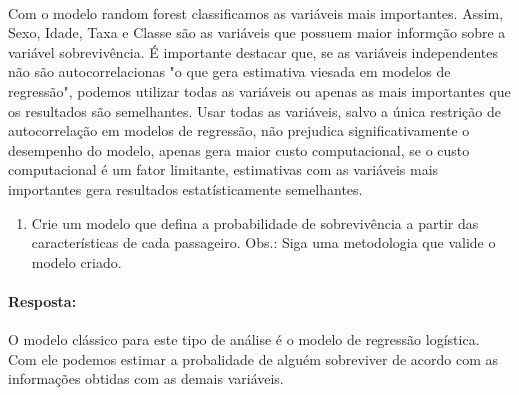 \documentclass[11pt]{article}
\providecommand{\tightlist}{%
      \setlength{\itemsep}{0pt}\setlength{\parskip}{0pt}}
\begin{document}
    \begin{center}
    \end{center}
    { \hspace*{\fill} \\}
    
    Com o modelo random forest classificamos as variáveis mais importantes.
Assim, Sexo, Idade, Taxa e Classe são as variáveis que possuem maior
informção sobre a variável sobrevivência. É importante destacar que, se
as variáveis independentes não são autocorrelacionas "o que gera
estimativa viesada em modelos de regressão", podemos utilizar todas as
variáveis ou apenas as mais importantes que os resultados são
semelhantes. Usar todas as variáveis, salvo a única restrição de
autocorrelação em modelos de regressão, não prejudica significativamente
o desempenho do modelo, apenas gera maior custo computacional, se o
custo computacional é um fator limitante, estimativas com as variáveis
mais importantes gera resultados estatísticamente semelhantes.

    \begin{enumerate}
\def\labelenumi{\arabic{enumi})}
\setcounter{enumi}{2}
\tightlist
\item
  Crie um modelo que defina a probabilidade de sobrevivência a partir
  das características de cada passageiro. Obs.: Siga uma metodologia que
  valide o modelo criado.
\end{enumerate}

\paragraph{Resposta:}\label{resposta}

O modelo clássico para este tipo de análise é o modelo de regressão
logística. Com ele podemos estimar a probalidade de alguém sobreviver de
acordo com as informações obtidas com as demais variáveis.
\end{document}
